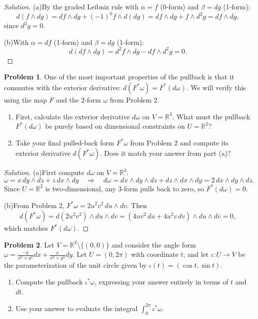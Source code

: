 \documentclass[12pt, a4paper]{article}
\theoremstyle{definition}
\newtheorem{problem}{Problem}
\newenvironment{solution}
  {\renewcommand\qedsymbol{$\blacksquare$}\begin{proof}[Solution]}
  {\end{proof}}
\begin{document}
\begin{solution}

(a)By the graded Leibniz rule with \(\alpha=f\) (0‑form) and \(\beta=dg\) (1‑form):
\[
d(f\wedge dg) = df\wedge dg + (-1)^{0}f\wedge d(dg) = df\wedge dg + f\wedge d^{2}g = df\wedge dg,
\]
since \(d^{2}g=0\).

(b)With \(\alpha=df\) (1‑form) and \(\beta=dg\) (1‑form):
\[
d(df\wedge dg) = d^{2}f\wedge dg - df\wedge d^{2}g = 0.
\]
\end{solution}

\vfill\newpage

\begin{problem}
One of the most important properties of the pullback is that it commutes with the exterior derivative: $d(F^*\omega) = F^*(d\omega)$. We will verify this using the map $F$ and the 2-form $\omega$ from Problem 2.
\begin{enumerate}
    \item[(a)] First, calculate the exterior derivative $d\omega$ on $V = \mathbb{R}^3$. What must the pullback $F^*(d\omega)$ be purely based on dimensional constraints on $U = \mathbb{R}^2$?
    \item[(b)] Take your final pulled-back form $F^*\omega$ from Problem 2 and compute its exterior derivative $d(F^*\omega)$. Does it match your answer from part (a)?
\end{enumerate}
\end{problem}

\begin{solution}

(a)First compute \(d\omega\) on \(V=\mathbb{R}^{3}\).
\[
\omega = x\,dy\wedge dz + z\,dx\wedge dy \quad\Rightarrow\quad d\omega = dx\wedge dy\wedge dz + dz\wedge dx\wedge dy = 2\,dx\wedge dy\wedge dz.
\]
Since \(U=\mathbb{R}^{2}\) is two‑dimensional, any 3‑form pulls back to zero, so \(F^{*}(d\omega)=0\).

(b)From Problem 2, \(F^{*}\omega = 2u^{2}v^{2}\,du\wedge dv\). Then
\[
d(F^{*}\omega) = d(2u^{2}v^{2})\wedge du\wedge dv = (4u v^{2}\,du + 4u^{2}v\,dv)\wedge du\wedge dv = 0,
\]
which matches \(F^{*}(d\omega)\).
\end{solution}

\vfill\newpage

\begin{problem}
Let $V = \mathbb{R}^2 \setminus \{(0,0)\}$ and consider the angle form $\omega = \frac{-y}{x^2+y^2}dx + \frac{x}{x^2+y^2}dy$. Let $U = (0, 2\pi)$ with coordinate $t$, and let $\iota: U \to V$ be the parameterization of the unit circle given by $\iota(t) = (\cos t, \sin t)$.
\begin{enumerate}
    \item[(a)] Compute the pullback $\iota^*\omega$, expressing your answer entirely in terms of $t$ and $dt$.
    \item[(b)] Use your answer to evaluate the integral $\int_0^{2\pi} \iota^*\omega$.
\end{enumerate}
\end{problem}
\end{document}
